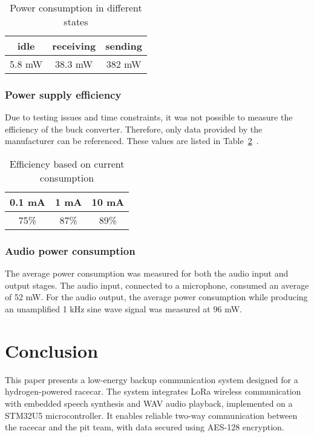 \documentclass[conference]{IEEEtran}
\begin{document}
\begin{table}[h]
  \centering
  \caption{Power consumption in different states}
\label{tab:power_consumption}
  \begin{tabular}{|c|c|c|}
    \hline
    \textbf{idle} & \textbf{receiving} & \textbf{sending} \\
    \hline
    5.8 mW & 38.3 mW & 382 mW \\
    \hline
  \end{tabular}
\end{table}

\subsubsection{Power supply efficiency}

Due to testing issues and time constraints, it was not possible to measure the efficiency of the buck converter.
Therefore, only data provided by the manufacturer can be referenced. These values are listed in Table~\ref{tab:power_suply_table}~\cite{TPS629203}.

\begin{table}[h]
  \centering
  \caption{Efficiency based on current consumption}
 \label{tab:power_suply_table}
  \begin{tabular}{|c|c|c|}
    \hline
    \textbf{0.1 mA} & \textbf{1 mA} & \textbf{10 mA} \\
    \hline
    75\% & 87\% & 89\% \\
    \hline
  \end{tabular}
\end{table}

\subsubsection{Audio power consumption}

The average power consumption was measured for both the audio input and output stages.
 The audio input, connected to a microphone, consumed an average of 52 mW. 
For the audio output, the average power consumption while producing an unamplified 1 kHz sine wave signal was measured at 96 mW.

\section{Conclusion}

This paper presents a low-energy backup communication system designed for a hydrogen-powered racecar. The system integrates LoRa wireless communication with embedded speech synthesis 
and WAV audio playback, implemented on a STM32U5 microcontroller. 
It enables reliable two-way communication between the racecar and the pit team, with data secured using AES-128 encryption.
\end{document}
